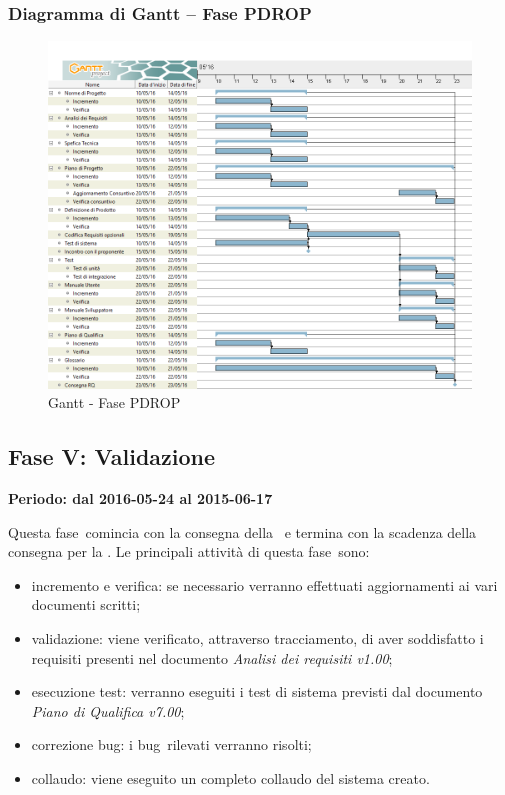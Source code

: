 \documentclass[../PianoProgetto.tex]{subfiles}
\begin{document}
		\subsubsection{Diagramma di Gantt – Fase PDROP}
			\begin{figure}[!h]
				\centering
				\includegraphics[width=\textwidth]{gantt_png/6-requisiti_facoltativi}
				\caption{Gantt - Fase PDROP}
				\label{fig:Gantt - Fase PDROP}
			\end{figure}
			
\newpage
	\subsection{Fase V: Validazione}
		\textbf{Periodo: dal 2016-05-24 al 2015-06-17}
		
		Questa fase\g\ comincia con la consegna della \revisionediqualifica\ e termina con la scadenza della consegna per la \revisionediaccettazione . Le principali attività di questa fase\g\ sono:

		\begin{itemize}
				\item incremento e verifica: se necessario verranno effettuati aggiornamenti ai vari documenti scritti;

				\item validazione: viene verificato, attraverso tracciamento, di aver soddisfatto i requisiti presenti nel documento \textit{Analisi dei requisiti v1.00};

				\item esecuzione test: verranno eseguiti i test di sistema previsti dal documento \textit{Piano di Qualifica v7.00};

				\item correzione bug\g : i bug\g\ rilevati verranno risolti;

				\item collaudo: viene eseguito un completo collaudo del sistema creato.
		\end{itemize}
		
\end{document}
